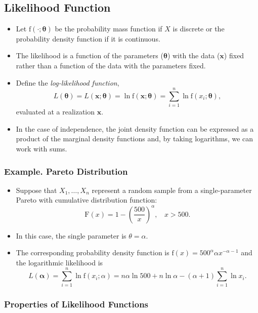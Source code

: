 \documentclass[]{book}
\theoremstyle{definition}
\theoremstyle{definition}
\theoremstyle{definition}
\theoremstyle{remark}
\begin{document}
\subsection{Likelihood Function}\label{likelihood-function}

\begin{itemize}
\item
  Let \(\mathrm{f}(\cdot;\boldsymbol\theta)\) be the probability mass
  function if \(X\) is discrete or the probability density function if
  it is continuous.
\item
  The likelihood is a function of the parameters
  (\(\boldsymbol \theta\)) with the data (\(\mathbf{x}\)) fixed rather
  than a function of the data with the parameters fixed.
\item
  Define the \emph{log-likelihood function},
  \[L(\boldsymbol \theta) = L(\mathbf{x};\boldsymbol \theta ) = \ln \mathrm{f}(\mathbf{x};\boldsymbol \theta) = \sum_{i=1}^n \ln \mathrm{f}(x_i;\boldsymbol \theta),\]
  evaluated at a realization \(\mathbf{x}\).
\item
  In the case of independence, the joint density function can be
  expressed as a product of the marginal density functions and, by
  taking logarithms, we can work with sums.
\end{itemize}

\subsubsection{Example. Pareto
Distribution}\label{example.-pareto-distribution}

\begin{itemize}
\item
  Suppose that \(X_1, \ldots, X_n\) represent a random sample from a
  single-parameter Pareto with cumulative distribution function:
  \[\mathrm{F}(x) = 1- \left(\frac{500}{x}\right)^{\alpha}, ~~~~ x>500 .\]
\item
  In this case, the single parameter is \(\theta = \alpha\).
\item
  The corresponding probability density function is
  \(\mathrm{f}(x) = 500^{\alpha} \alpha x^{-\alpha-1}\) and the
  logarithmic likelihood is
  \[L(\boldsymbol \alpha) = \sum_{i=1}^n \ln \mathrm{f}(x_i;\alpha) = n \alpha \ln 500 +n \ln \alpha -(\alpha+1)  \sum_{i=1}^n \ln x_i .\]
\end{itemize}

\subsubsection{Properties of Likelihood
Functions}\label{properties-of-likelihood-functions}
\end{document}

